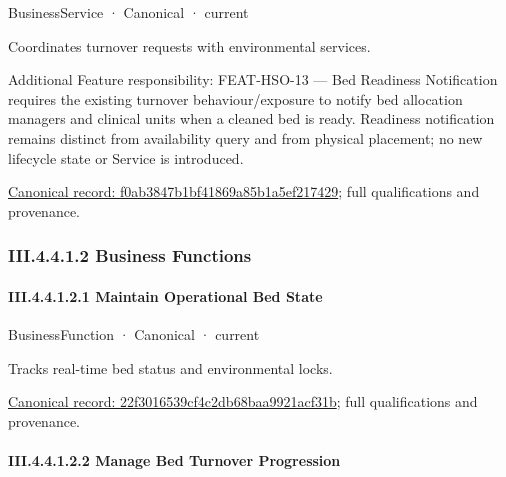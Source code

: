 \label{element:f0ab3847b1bf41869a85b1a5ef217429}
{\small BusinessService · Canonical · current}\par

Coordinates turnover requests with environmental services.



Additional Feature responsibility: FEAT-HSO-13 — Bed Readiness Notification requires the existing turnover behaviour/exposure to notify bed allocation managers and clinical units when a cleaned bed is ready. Readiness notification remains distinct from availability query and from physical placement; no new lifecycle state or Service is introduced.


{\footnotesize \href{../../../../../../../continuum/business/business-service/f0ab3847b1bf41869a85b1a5ef217429.md}{Canonical record: f0ab3847b1bf41869a85b1a5ef217429}; full qualifications and provenance.}\par
\subsubsection*{III.4.4.1.2 Business Functions}
\label{navigation:III.4.4.1.2}

\paragraph*{III.4.4.1.2.1 Maintain Operational Bed State}
\label{navigation:III.4.4.1.2.1}

\label{element:22f3016539cf4c2db68baa9921acf31b}
{\small BusinessFunction · Canonical · current}\par

Tracks real-time bed status and environmental locks.


{\footnotesize \href{../../../../../../../continuum/business/business-function/22f3016539cf4c2db68baa9921acf31b.md}{Canonical record: 22f3016539cf4c2db68baa9921acf31b}; full qualifications and provenance.}\par
\paragraph*{III.4.4.1.2.2 Manage Bed Turnover Progression}
\label{navigation:III.4.4.1.2.2}

